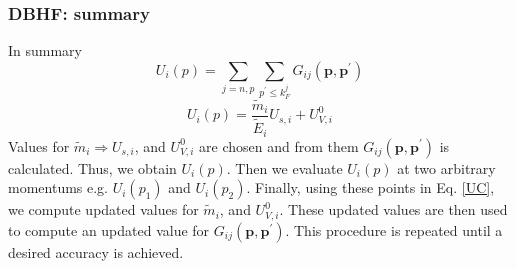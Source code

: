 \documentclass[10pt,serif]{beamer}
\newcommand{\bvec}[1]{\boldsymbol{#1}}
\newcommand{\rb}[1]{\left(#1\right)}
\begin{document}
\begin{frame}
\frametitle{DBHF: summary}
In summary
\begin{equation}
U_i \rb{p} = \sum_{j=n,p} \sum_{p^\prime \leq k^j_F} G_{ij} \rb{\bvec{p},\bvec{p}^\prime}
\label{UG}
\end{equation}
\begin{equation}
U_i \rb{p} = \frac{\tilde{m}_i}{\tilde{E}_i} U_{s,i} + U^0_{V,i}
\label{UC}
\end{equation}
Values for $\tilde{m}_i \Rightarrow U_{s,i}$, and $U^0_{V,i}$ are chosen and from them $G_{ij} \rb{\bvec{p},\bvec{p}^\prime}$ is calculated. Thus, we obtain $U_i \rb{p}$. Then we evaluate $U_i \rb{p}$ at two arbitrary momentums e.g. $U_i \rb{p_1}$ and $U_i \rb{p_2}$. Finally, using these points in Eq. \ref{UC}, we compute updated values for $\tilde{m}_i$, and $U^0_{V,i}$. These updated values are then used to compute an updated value for $G_{ij} \rb{\bvec{p},\bvec{p}^\prime}$. This procedure is repeated until a desired accuracy is achieved.   
\end{frame}
\end{document}
